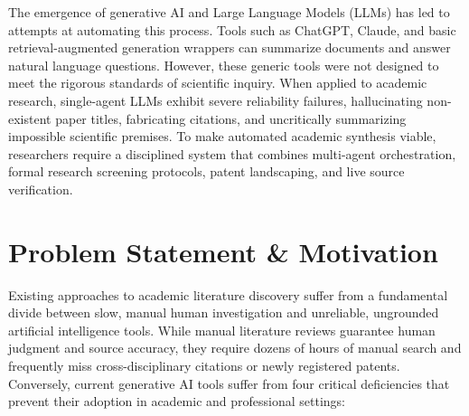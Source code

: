 \documentclass[11pt,a4paper]{article}
\begin{document}
The emergence of generative AI and Large Language Models (LLMs) has led to attempts at automating this process. Tools such as ChatGPT, Claude, and basic retrieval-augmented generation wrappers can summarize documents and answer natural language questions. However, these generic tools were not designed to meet the rigorous standards of scientific inquiry. When applied to academic research, single-agent LLMs exhibit severe reliability failures, hallucinating non-existent paper titles, fabricating citations, and uncritically summarizing impossible scientific premises. To make automated academic synthesis viable, researchers require a disciplined system that combines multi-agent orchestration, formal research screening protocols, patent landscaping, and live source verification.

\section{Problem Statement \& Motivation}
Existing approaches to academic literature discovery suffer from a fundamental divide between slow, manual human investigation and unreliable, ungrounded artificial intelligence tools. While manual literature reviews guarantee human judgment and source accuracy, they require dozens of hours of manual search and frequently miss cross-disciplinary citations or newly registered patents. Conversely, current generative AI tools suffer from four critical deficiencies that prevent their adoption in academic and professional settings:
\end{document}
